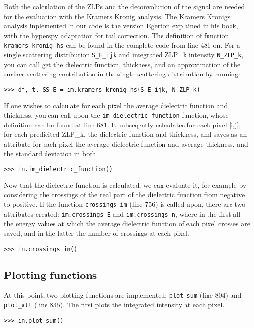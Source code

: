 \documentclass{article}
\begin{document}
Both the calculation of the ZLPs and the deconvolution of the signal are needed for the evaluation with the Kramers Kronig analysis. The Kramers Kronigs analysis inplemented in our code is the version Egerton explained in his book, with the hyperspy adaptation for tail correction. The definition of function \verb|kramers_kronig_hs| can be found in the complete code from line 481 on. For a single scattering distribution \verb|S_E_ijk| and integrated ZLP\_k intensity \verb|N_ZLP_k|, you can call get the dielectric function, thickness, and an approximation of the surface scattering contribution in the single scattering distribution by running:
\begin{lstlisting}
>>> df, t, SS_E = im.kramers_kronig_hs(S_E_ijk, N_ZLP_k)
\end{lstlisting}

If one wishes to calculate for each pixel the average dielectric function and thickness, you can call upon the \verb|im_dielectric_function| function, whose definition can be found at line 681. It subseqently calculates for each pixel [i,j], for each predicited ZLP\_k, the dielectric function and thickness, and saves as an attribute for each pixel the average dielectric function and average thickness, and the standard deviation in both.
\begin{lstlisting}
>>> im.im_dielectric_function()
\end{lstlisting}

Now that the dielectric function is calculated, we can evaluate it, for example by considering the crossings of the real part of the dielectric function from negative to positive. If the function \verb|crossings_im| (line 756) is called upon, there are two attributes created: \verb|im.crossings_E| and \verb|im.crossings_n|, where in the first all the energy values at which the average dielectric function of each pixel crosses are saved, and in the latter the number of crossings at each pixel.

\begin{lstlisting}
>>> im.crossings_im()
\end{lstlisting}

\subsection{Plotting functions}
At this point, two plotting functions are implemented: \verb|plot_sum| (line 804) and \verb|plot_all| (line 835). The first plots the integrated intensity at each pixel. 
\begin{lstlisting}
>>> im.plot_sum()
\end{lstlisting}
\end{document}
